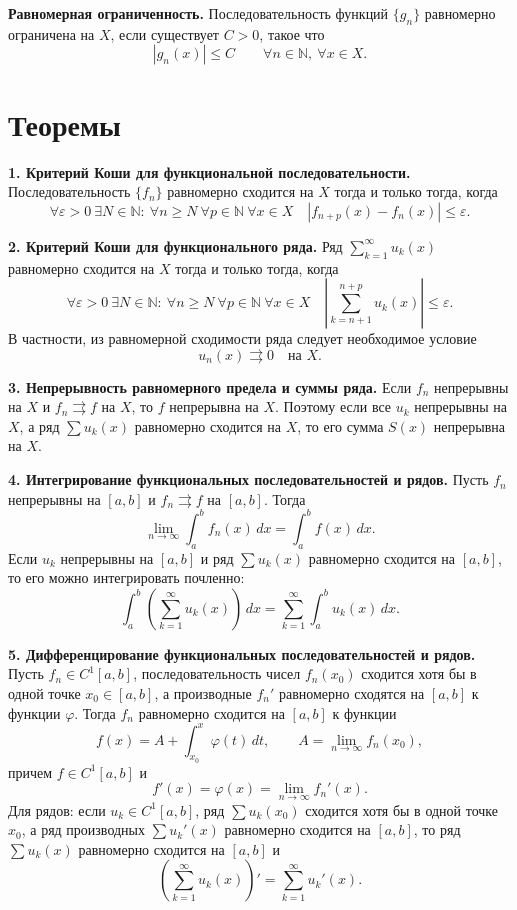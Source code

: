 \documentclass[12pt,a4paper]{article}
\newcommand{\eps}{\varepsilon}
\newcommand{\dd}{\,d}
\begin{document}
\textbf{Равномерная ограниченность.}
Последовательность функций \(\{g_n\}\) равномерно ограничена на \(X\), если
существует \(C>0\), такое что
\[
  |g_n(x)|\le C\qquad \forall n\in\mathbb N,\ \forall x\in X.
\]

\section*{Теоремы}

\textbf{1. Критерий Коши для функциональной последовательности.}
Последовательность \(\{f_n\}\) равномерно сходится на \(X\) тогда и только
тогда, когда
\[
  \forall\eps>0\ \exists N\in\mathbb N:\ 
  \forall n\ge N\ \forall p\in\mathbb N\ \forall x\in X
  \quad |f_{n+p}(x)-f_n(x)|\le \eps.
\]

\textbf{2. Критерий Коши для функционального ряда.}
Ряд \(\sum_{k=1}^{\infty}u_k(x)\) равномерно сходится на \(X\) тогда и только
тогда, когда
\[
  \forall\eps>0\ \exists N\in\mathbb N:\ 
  \forall n\ge N\ \forall p\in\mathbb N\ \forall x\in X
  \quad
  \left|\sum_{k=n+1}^{n+p}u_k(x)\right|\le \eps.
\]
В частности, из равномерной сходимости ряда следует необходимое условие
\[
  u_n(x)\rightrightarrows 0\quad \text{на }X.
\]

\textbf{3. Непрерывность равномерного предела и суммы ряда.}
Если \(f_n\) непрерывны на \(X\) и \(f_n\rightrightarrows f\) на \(X\), то
\(f\) непрерывна на \(X\). Поэтому если все \(u_k\) непрерывны на \(X\), а ряд
\(\sum u_k(x)\) равномерно сходится на \(X\), то его сумма \(S(x)\) непрерывна
на \(X\).

\textbf{4. Интегрирование функциональных последовательностей и рядов.}
Пусть \(f_n\) непрерывны на \([a,b]\) и \(f_n\rightrightarrows f\) на
\([a,b]\). Тогда
\[
  \lim_{n\to\infty}\int_a^b f_n(x)\dd x
  =
  \int_a^b f(x)\dd x.
\]
Если \(u_k\) непрерывны на \([a,b]\) и ряд \(\sum u_k(x)\) равномерно
сходится на \([a,b]\), то его можно интегрировать почленно:
\[
  \int_a^b\left(\sum_{k=1}^{\infty}u_k(x)\right)\dd x
  =
  \sum_{k=1}^{\infty}\int_a^b u_k(x)\dd x.
\]

\textbf{5. Дифференцирование функциональных последовательностей и рядов.}
Пусть \(f_n\in C^1[a,b]\), последовательность чисел \(f_n(x_0)\) сходится хотя
бы в одной точке \(x_0\in[a,b]\), а производные \(f_n'\) равномерно сходятся
на \([a,b]\) к функции \(\varphi\). Тогда \(f_n\) равномерно сходится на
\([a,b]\) к функции
\[
  f(x)=A+\int_{x_0}^x\varphi(t)\dd t,\qquad
  A=\lim_{n\to\infty}f_n(x_0),
\]
причем \(f\in C^1[a,b]\) и
\[
  f'(x)=\varphi(x)=\lim_{n\to\infty}f_n'(x).
\]
Для рядов: если \(u_k\in C^1[a,b]\), ряд \(\sum u_k(x_0)\) сходится хотя бы в
одной точке \(x_0\), а ряд производных \(\sum u_k'(x)\) равномерно сходится
на \([a,b]\), то ряд \(\sum u_k(x)\) равномерно сходится на \([a,b]\) и
\[
  \left(\sum_{k=1}^{\infty}u_k(x)\right)'
  =
  \sum_{k=1}^{\infty}u_k'(x).
\]
\end{document}
